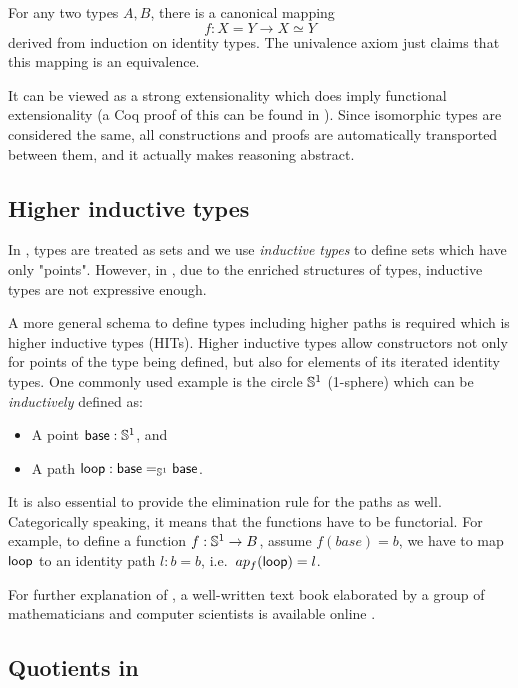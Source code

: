For any two types $A, B$, there is a canonical mapping $$f : X = Y \to X \simeq Y$$ derived from induction on identity types. The univalence axiom just claims that this mapping is an equivalence. 


It can be viewed as a strong extensionality which does imply functional extensionality (a Coq proof of this can be found in \cite{uafe}). 
Since isomorphic types are considered the same, all constructions and proofs are automatically transported between them, and it actually makes reasoning abstract.


\subsection{Higher inductive types}\label{HITs}

In \itt, types are treated as sets and we use \emph{inductive types} to define sets which have only "points". However, in \hott, due to the enriched structures of types, inductive types are not expressive enough.

A more general schema to define types including higher paths is required which is higher inductive types (HITs). Higher inductive types allow constructors not only for points of the type being defined, but also for elements of its iterated identity types.
One commonly used example is the circle $\Sn^1$ (1-sphere) which can be \emph{inductively} defined as:

\begin{itemize}
\item A point $\base:\Sn^1$, and
\item A path $\lloop : {\id[\Sn^1]\base\base}$.
\end{itemize}

It is also essential to provide the elimination rule for the paths as well. Categorically speaking, it means that the functions have to be functorial. For example, to define a function $f :\Sn^1 \rightarrow B$, assume $f(base)=b$, we have to map $\lloop$ to an identity path $l : b = b$, i.e.\ $ap_{f}(\lloop)=l$.


For further explanation of \hott, a well-written text book elaborated by a group of mathematicians and computer scientists is available online \cite{hott}. 



\subsection{Quotients in \hott}\label{hott:ext}

